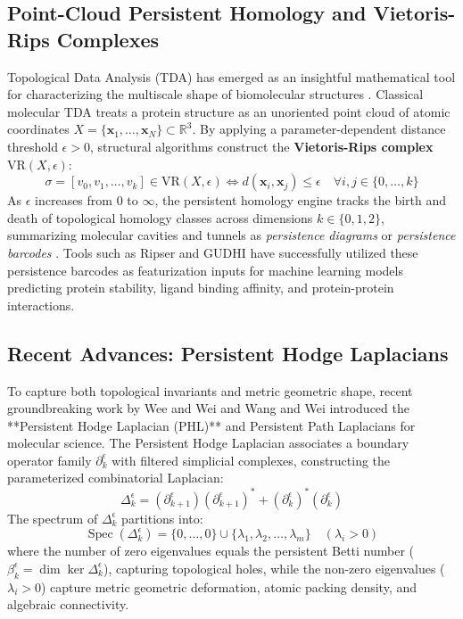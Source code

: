 \subsection{Point-Cloud Persistent Homology and Vietoris-Rips Complexes}
Topological Data Analysis (TDA) has emerged as an insightful mathematical tool for characterizing the multiscale shape of biomolecular structures \cite{edelsbrunner2002topological, carlsson2009topology}. Classical molecular TDA treats a protein structure as an unoriented point cloud of atomic coordinates $X = \{\mathbf{x}_1, \dots, \mathbf{x}_N\} \subset \mathbb{R}^3$. By applying a parameter-dependent distance threshold $\epsilon > 0$, structural algorithms construct the \textbf{Vietoris-Rips complex} $\mathrm{VR}(X, \epsilon)$:
\begin{equation}
    \sigma = [v_0, v_1, \dots, v_k] \in \mathrm{VR}(X, \epsilon) \iff d(\mathbf{x}_i, \mathbf{x}_j) \le \epsilon \quad \forall i, j \in \{0, \dots, k\}
\end{equation}
As $\epsilon$ increases from 0 to $\infty$, the persistent homology engine tracks the birth and death of topological homology classes across dimensions $k \in \{0, 1, 2\}$, summarizing molecular cavities and tunnels as \textit{persistence diagrams} or \textit{persistence barcodes} \cite{ghrist2014elementary}. Tools such as Ripser and GUDHI have successfully utilized these persistence barcodes as featurization inputs for machine learning models predicting protein stability, ligand binding affinity, and protein-protein interactions.

\subsection{Recent Advances: Persistent Hodge Laplacians}
To capture both topological invariants and metric geometric shape, recent groundbreaking work by Wee and Wei \cite{wee2021persistent} and Wang and Wei \cite{wang2023persistent} introduced the **Persistent Hodge Laplacian (PHL)** and Persistent Path Laplacians for molecular science. The Persistent Hodge Laplacian associates a boundary operator family $\partial_k^\epsilon$ with filtered simplicial complexes, constructing the parameterized combinatorial Laplacian:
\begin{equation}
    \Delta_k^\epsilon = (\partial_{k+1}^\epsilon) (\partial_{k+1}^\epsilon)^* + (\partial_k^\epsilon)^* (\partial_k^\epsilon)
\end{equation}
The spectrum of $\Delta_k^\epsilon$ partitions into:
\begin{equation}
    \operatorname{Spec}(\Delta_k^\epsilon) = \{ 0, \dots, 0 \} \cup \{ \lambda_1, \lambda_2, \dots, \lambda_m \} \quad (\lambda_i > 0)
\end{equation}
where the number of zero eigenvalues equals the persistent Betti number ($\beta_k^\epsilon = \dim \ker \Delta_k^\epsilon$), capturing topological holes, while the non-zero eigenvalues ($\lambda_i > 0$) capture metric geometric deformation, atomic packing density, and algebraic connectivity.


